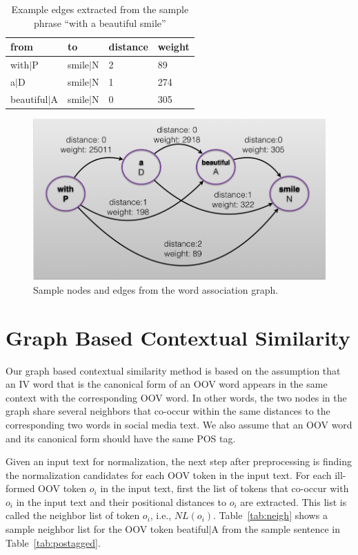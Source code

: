 \documentclass[a4paper,onesided,12pt]{report}
\begin{document}
\begin{table}[hbt]
  \caption{Example edges extracted from the sample phrase  ``with a beautiful smile''}
  \centering
  \begin{tabular}[tc]{|l|l|l|l|}
    \hline
from & to & distance & weight \\
\hline
 with$|$P &  smile$|$N & 2 & 89 \\
 a$|$D & smile$|$N & 1 & 274 \\
 beautiful$|$A & smile$|$N & 0 & 305 \\
    \hline
\end{tabular}
\label{tab:edges}
\end{table}

\begin{figure}[htb]
\begin{center}
\includegraphics[scale=0.5]{fig/edges}
\caption{Sample nodes and edges from the word association graph.}
\label{fig:edges}
\end{center}
\end{figure}


\section{Graph Based Contextual Similarity}

Our graph based contextual similarity method is based on the assumption that an IV word that is the canonical form of an OOV word appears in the same context with the corresponding OOV word. In other words, the two nodes in the graph share several neighbors that co-occur within the same distances to the corresponding two words in social media text. We also assume that an OOV word and its canonical form should have the same POS tag.

Given an input text for normalization, the next step after preprocessing is finding the normalization candidates for each OOV token in the input text. For each ill-formed OOV token $o_i$ in the input text, first the list of tokens that co-occur with $o_i$ in the input text and their positional distances to $o_i$ are extracted.  This list is called the neighbor list of token $o_i$, i.e.,  $NL(o_i)$. Table~\ref{tab:neigh} shows a sample neighbor list for the OOV token beatiful$|$A from the sample sentence in Table~\ref{tab:postagged}.
\end{document}
